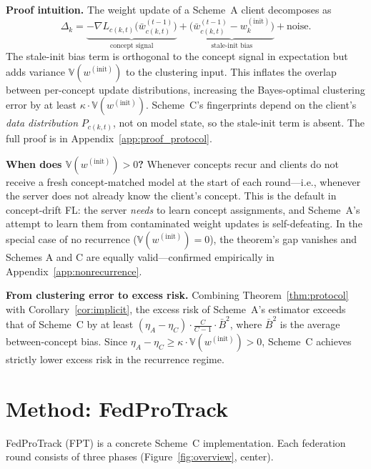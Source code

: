 \documentclass[11pt]{article}
\newcommand{\V}{\mathbb{V}}
\newcommand{\wbar}{\bar{w}}
\begin{document}
\textbf{Proof intuition.}
The weight update of a Scheme~A client decomposes as
\begin{equation}
\Delta_k = \underbrace{-\nabla L_{c(k,t)}\!\bigl(\wbar_{c(k,t)}^{(t-1)}\bigr)}_{\text{concept signal}} + \underbrace{\bigl(\wbar_{c(k,t)}^{(t-1)} - w_k^{(\mathrm{init})}\bigr)}_{\text{stale-init bias}} + \text{noise}.
\label{eq:decompose}
\end{equation}
The stale-init bias term is orthogonal to the concept signal in expectation but adds variance $\V(w^{(\mathrm{init})})$ to the clustering input.
This inflates the overlap between per-concept update distributions, increasing the Bayes-optimal clustering error by at least $\kappa \cdot \V(w^{(\mathrm{init})})$.
Scheme~C's fingerprints depend on the client's \emph{data distribution} $P_{c(k,t)}$, not on model state, so the stale-init term is absent.
The full proof is in Appendix~\ref{app:proof_protocol}.

\textbf{When does $\V(w^{(\mathrm{init})}) > 0$?}
Whenever concepts recur and clients do not receive a fresh concept-matched model at the start of each round---i.e., whenever the server does not already know the client's concept.
This is the default in concept-drift FL: the server \emph{needs} to learn concept assignments, and Scheme~A's attempt to learn them from contaminated weight updates is self-defeating.
In the special case of no recurrence ($\V(w^{(\mathrm{init})}) = 0$), the theorem's gap vanishes and Schemes A and C are equally valid---confirmed empirically in Appendix~\ref{app:nonrecurrence}.

\textbf{From clustering error to excess risk.}
Combining Theorem~\ref{thm:protocol} with Corollary~\ref{cor:implicit}, the excess risk of Scheme~A's estimator exceeds that of Scheme~C by at least $(\eta_A - \eta_C) \cdot \frac{C}{C-1} \cdot \bar B^2$, where $\bar B^2$ is the average between-concept bias.
Since $\eta_A - \eta_C \ge \kappa \cdot \V(w^{(\mathrm{init})}) > 0$, Scheme~C achieves strictly lower excess risk in the recurrence regime.


\section{Method: FedProTrack}
\label{sec:method}

FedProTrack (FPT) is a concrete Scheme~C implementation.
Each federation round consists of three phases (Figure~\ref{fig:overview}, center).
\end{document}
